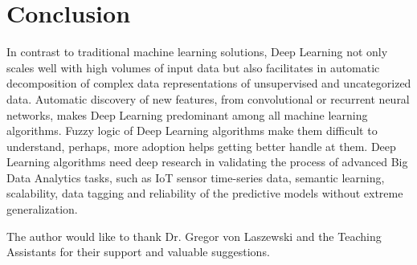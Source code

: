 \documentclass[sigconf]{acmart}
\begin{document}
	\section{Conclusion}		

	In contrast to traditional machine learning solutions, Deep Learning not only scales well with high volumes of input data but also facilitates in automatic decomposition of complex data representations of unsupervised and uncategorized data. Automatic discovery of new features, from convolutional or recurrent neural networks, makes Deep Learning predominant among all machine learning algorithms. Fuzzy logic of Deep Learning algorithms make them difficult to understand, perhaps, more adoption helps getting better handle at them. Deep Learning algorithms need deep research in validating the process of advanced Big Data Analytics tasks, such as IoT sensor time-series data, semantic learning, scalability, data tagging and reliability of the predictive models without extreme generalization.  
	
	\begin{acks}		
	
		The author would like to thank Dr. Gregor von Laszewski and the Teaching Assistants for their support and valuable suggestions.
		
	\end{acks}

	
	 
	

	
\end{document}
